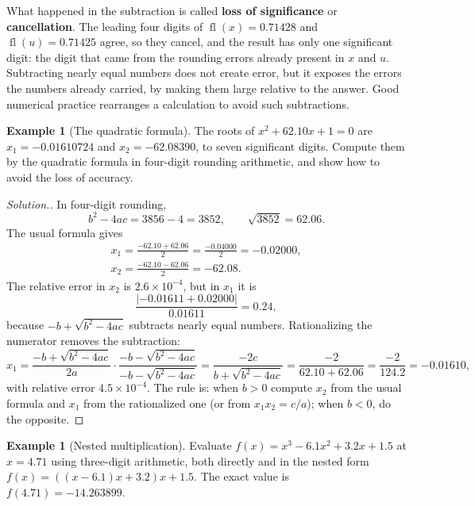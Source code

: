 \documentclass[11pt,a4paper]{article}
\numberwithin{equation}{section}
\DeclareMathOperator{\fl}{fl}
\theoremstyle{definition}
\newtheorem{exa}[thm]{Example}
\newenvironment{solution}
  {\renewcommand{\qedsymbol}{}\begin{proof}[\textit{Solution}.]}
  {\end{proof}}
\begin{document}
What happened in the subtraction is called \textbf{loss of significance} or \textbf{cancellation}. The leading four digits of
$\fl(x) = 0.71428$ and $\fl(u) = 0.71425$ agree, so they cancel, and the result has only one significant digit: the digit that came from
the rounding errors already present in $x$ and $u$. Subtracting nearly equal numbers does not create error, but it exposes the errors
the numbers already carried, by making them large relative to the answer. Good numerical practice rearranges a calculation to avoid
such subtractions.

\begin{exa}[The quadratic formula]
\label{exa:quadratic}
The roots of $x^2+62.10x+1 = 0$ are $x_1 = -0.01610724$ and $x_2 = -62.08390$, to seven significant digits. Compute them by the
quadratic formula in four-digit rounding arithmetic, and show how to avoid the loss of accuracy.
\end{exa}

\begin{solution}
In four-digit rounding,
$$b^2 - 4ac = 3856 - 4 = 3852,\qquad \sqrt{3852} = 62.06 .$$
The usual formula gives
\begin{gather*}
x_1 = \frac{-62.10+62.06}{2} = \frac{-0.04000}{2} = -0.02000,\\
x_2 = \frac{-62.10-62.06}{2} = -62.08 .
\end{gather*}
The relative error in $x_2$ is $2.6\times10^{-4}$, but in $x_1$ it is
$$\frac{|-0.01611+0.02000|}{0.01611} = 0.24 ,$$
because $-b+\sqrt{b^2-4ac}$ subtracts nearly equal numbers. Rationalizing the numerator removes the subtraction:
$$x_1 = \frac{-b+\sqrt{b^2-4ac}}{2a}\cdot\frac{-b-\sqrt{b^2-4ac}}{-b-\sqrt{b^2-4ac}} = \frac{-2c}{b+\sqrt{b^2-4ac}} = \frac{-2}{62.10+62.06} = \frac{-2}{124.2} = -0.01610,$$
with relative error $4.5\times10^{-4}$. The rule is: when $b>0$ compute $x_2$ from the usual formula and $x_1$ from the rationalized
one (or from $x_1x_2 = c/a$); when $b<0$, do the opposite.
\end{solution}

\begin{exa}[Nested multiplication]
\label{exa:horner}
Evaluate $f(x) = x^3-6.1x^2+3.2x+1.5$ at $x = 4.71$ using three-digit arithmetic, both directly and in the nested form
$f(x) = ((x-6.1)x+3.2)x+1.5$. The exact value is $f(4.71) = -14.263899$.
\end{exa}
\end{document}
